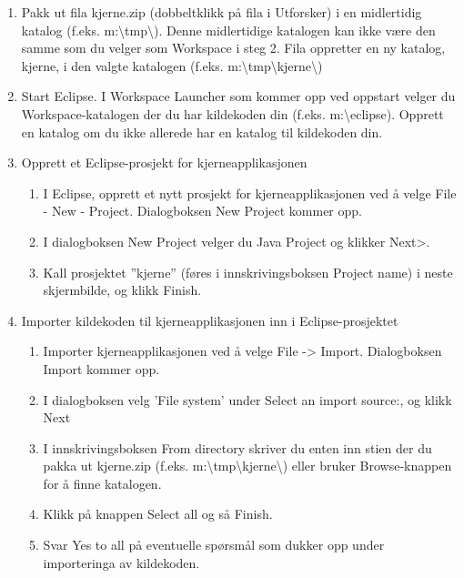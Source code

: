 \begin{enumerate}

\item
Pakk ut fila kjerne.zip (dobbeltklikk på fila i Utforsker) i en midlertidig katalog (f.eks. m:\textbackslash tmp\textbackslash ).  Denne midlertidige katalogen kan ikke være den samme som du velger som Workspace i steg 2. Fila oppretter en ny katalog, kjerne, i den valgte katalogen (f.eks. m:\textbackslash tmp\textbackslash kjerne\textbackslash )

\item
Start Eclipse. I Workspace Launcher som kommer opp ved oppstart velger du Workspace-katalogen der du har kildekoden din (f.eks. m:\textbackslash eclipse).  Opprett en katalog om du ikke allerede har en katalog til kildekoden din.

\item
Opprett et Eclipse-prosjekt for kjerneapplikasjonen
\begin{enumerate}

\item
I Eclipse, opprett et nytt prosjekt for kjerneapplikasjonen ved å velge File - New - Project.  Dialogboksen New Project kommer opp.

\item
I dialogboksen New Project velger du Java Project og klikker Next>.

\item
Kall prosjektet ”kjerne” (føres i innskrivingsboksen Project name) i neste skjermbilde, og klikk Finish.

\end{enumerate}

\item
Importer kildekoden til kjerneapplikasjonen inn i Eclipse-prosjektet

\begin{enumerate}

\item
Importer kjerneapplikasjonen ved å velge File -> Import.  Dialogboksen Import kommer opp.

\item
I dialogboksen velg 'File system' under Select an import source:, og klikk Next

\item
I innskrivingsboksen From directory skriver du enten inn stien der du pakka ut kjerne.zip (f.eks. m:\textbackslash tmp\textbackslash kjerne\textbackslash ) eller bruker Browse-knappen for å finne katalogen.

\item
Klikk på knappen Select all og så Finish.

\item
Svar Yes to all på eventuelle spørsmål som dukker opp under importeringa av kildekoden.

\end{enumerate}

\end{enumerate}


